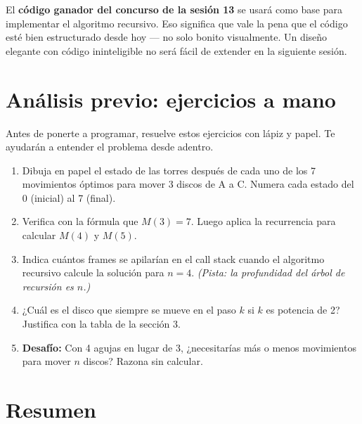 \documentclass[12pt, oneside]{article}
\begin{document}
\begin{consejo}
  El \textbf{código ganador del concurso de la sesión 13} se usará como
  base para implementar el algoritmo recursivo.  Eso significa que vale
  la pena que el código esté bien estructurado desde hoy — no solo bonito
  visualmente.  Un diseño elegante con código ininteligible no será fácil
  de extender en la siguiente sesión.
\end{consejo}

\section{Análisis previo: ejercicios a mano}

Antes de ponerte a programar, resuelve estos ejercicios con lápiz y papel.
Te ayudarán a entender el problema desde adentro.

\begin{enumerate}
  \item Dibuja en papel el estado de las torres después de cada uno de los
        7 movimientos óptimos para mover 3 discos de A a C.
        Numera cada estado del 0 (inicial) al 7 (final).

  \item Verifica con la fórmula que $M(3) = 7$.
        Luego aplica la recurrencia para calcular $M(4)$ y $M(5)$.

  \item Indica cuántos frames se apilarían en el call stack cuando el
        algoritmo recursivo calcule la solución para $n = 4$.
        \textit{(Pista: la profundidad del árbol de recursión es $n$.)}

  \item ¿Cuál es el disco que siempre se mueve en el paso $k$
        si $k$ es potencia de 2?  Justifica con la tabla de la sección 3.

  \item \textbf{Desafío:}
        Con 4 agujas en lugar de 3, ¿necesitarías más o menos movimientos
        para mover $n$ discos?  Razona sin calcular.
\end{enumerate}

\section{Resumen}
\end{document}
